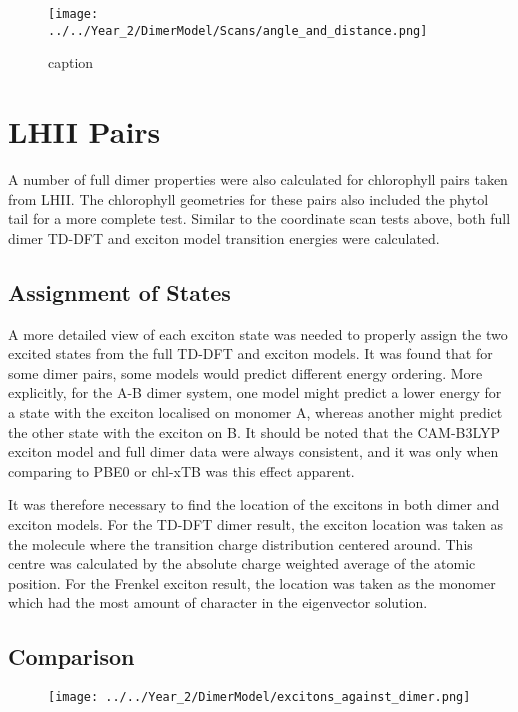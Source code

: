 \label{subsec:distance}
\begin{figure}
    \texttt{[image: ../../Year\_2/DimerModel/Scans/angle\_and\_distance.png]}
    \caption{caption}
\end{figure}

\section{LHII Pairs}
\label{sec:LHII_excitons}

A number of full dimer properties were also calculated for chlorophyll pairs taken
from LHII. The chlorophyll geometries for these pairs also included the phytol tail
for a more complete test.
Similar to the coordinate scan tests above, both full dimer TD-DFT and exciton model
transition energies were calculated.

\subsection{Assignment of States}
\label{subsec:state_assign}

A more detailed view of each exciton state was needed to properly assign the two
excited states from the full TD-DFT and exciton models. It was found that for some
dimer pairs, some models would predict different energy ordering. More explicitly, 
for the A-B dimer system, one model might predict a lower energy for a state with
the exciton localised on monomer A, whereas another might predict the other state
with the exciton on B. It should be noted that the CAM-B3LYP exciton model and full
dimer data were always consistent, and it was only when comparing to PBE0 or chl-xTB
was this effect apparent.

It was therefore necessary to find the location of the excitons in both dimer and
exciton models. For the TD-DFT dimer result, the exciton location was taken as the
molecule where the transition charge distribution centered around. This centre was
calculated by the absolute charge weighted average of the atomic position. For the
Frenkel exciton result, the location was taken as the monomer which had the most
amount of character in the eigenvector solution.

\subsection{Comparison}
\label{subsec:comparison}
\begin{figure}
    \texttt{[image: ../../Year\_2/DimerModel/excitons\_against\_dimer.png]}
\end{figure}

